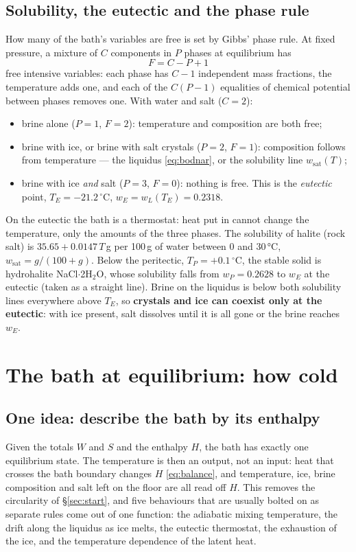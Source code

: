 \documentclass[11pt,a4paper]{article}
\newcommand{\dC}{\,^{\circ}\mathrm{C}}
\begin{document}
\subsection{Solubility, the eutectic and the phase rule}
\label{sec:phaserule}
How many of the bath's variables are free is set by Gibbs' phase rule. At fixed pressure, a mixture
of $C$ components in $P$ phases at equilibrium has
\begin{equation}
F = C - P + 1
\label{eq:phaserule}
\end{equation}
free intensive variables: each phase has $C - 1$ independent mass fractions, the temperature adds
one, and each of the $C(P-1)$ equalities of chemical potential between phases removes one. With
water and salt ($C = 2$):
\begin{itemize}
\item brine alone ($P = 1$, $F = 2$): temperature and composition are both free;
\item brine with ice, or brine with salt crystals ($P = 2$, $F = 1$): composition follows from
temperature — the liquidus \eqref{eq:bodnar}, or the solubility line $w_{\text{sat}}(T)$;
\item brine with ice \emph{and} salt ($P = 3$, $F = 0$): nothing is free. This is the \emph{eutectic}
point, $T_E = -21.2\dC$, $w_E = w_L(T_E) = 0.2318$.
\end{itemize}
On the eutectic the bath is a thermostat: heat put in cannot change the temperature, only the amounts
of the three phases. The solubility of halite (rock salt) is $35.65 + 0.0147\,T$\,g per 100\,g of
water between 0 and 30\,°C, $w_{\text{sat}} = g/(100+g)$. Below the peritectic, $T_P = +0.1\dC$, the
stable solid is hydrohalite NaCl$\cdot$2H$_2$O, whose solubility falls from $w_P = 0.2628$ to $w_E$ at
the eutectic (taken as a straight line). Brine on the liquidus is below both solubility lines
everywhere above $T_E$, so \textbf{crystals and ice can coexist only at the eutectic}: with ice
present, salt dissolves until it is all gone or the brine reaches $w_E$.

\section{The bath at equilibrium: how cold}
\label{sec:equilibrium}

\subsection{One idea: describe the bath by its enthalpy}
Given the totals $W$ and $S$ and the enthalpy $H$, the bath has exactly one equilibrium state. The
temperature is then an output, not an input: heat that crosses the bath boundary changes $H$
\eqref{eq:balance}, and temperature, ice, brine composition and salt left on the floor are all read off
$H$. This removes the circularity of §\ref{sec:start}, and five behaviours that are usually bolted on as
separate rules come out of one function: the adiabatic mixing temperature, the drift along the
liquidus as ice melts, the eutectic thermostat, the exhaustion of the ice, and the temperature
dependence of the latent heat.
\end{document}
